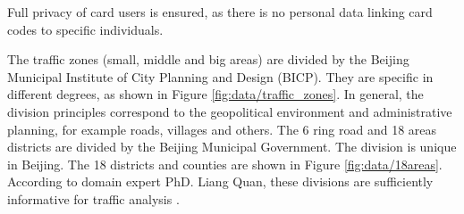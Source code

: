 \documentclass{article}
\begin{document}
Full privacy of card users is ensured, as there is no personal data linking card codes to specific individuals. 

The traffic zones (small, middle and big areas) are divided by the Beijing Municipal Institute of City Planning and Design (BICP). They are specific in different degrees, as shown in Figure \ref{fig:data/traffic_zones}. In general, the division principles correspond to the geopolitical environment and administrative planning, for example roads, villages and others. The 6 ring road and 18 areas districts are divided by the Beijing Municipal Government. The division is unique in Beijing. The 18 districts and counties are shown in Figure \ref{fig:data/18areas}. According to domain expert PhD. Liang Quan, these divisions are sufficiently informative for traffic analysis \cite{liang}.
\end{document}
